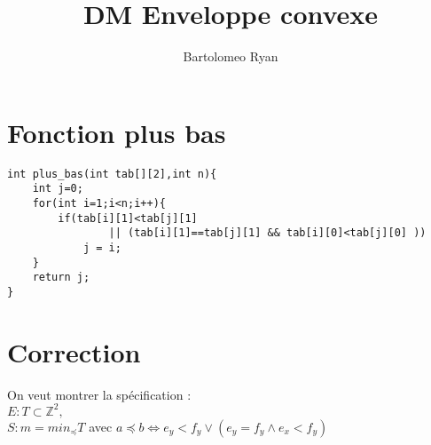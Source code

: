 \documentclass{article}
\title{DM Enveloppe convexe}
\author{Bartolomeo Ryan}
\begin{document}
\maketitle


\section{Fonction plus bas}
\begin{lstlisting}
int plus_bas(int tab[][2],int n){
    int j=0;
    for(int i=1;i<n;i++){
        if(tab[i][1]<tab[j][1] 
                || (tab[i][1]==tab[j][1] && tab[i][0]<tab[j][0] ))
            j = i;
    }
    return j;
}
\end{lstlisting}
\section{Correction}
On veut montrer la spécification :  \\ 
$E : T \subset \mathbb{Z}^2, $   \\
$S : m = min_{\preceq} T$ avec  $a \preceq b  \Leftrightarrow e_y<f_y \lor (e_y=f_y \land e_x<f_y)$\\
\end{document}
